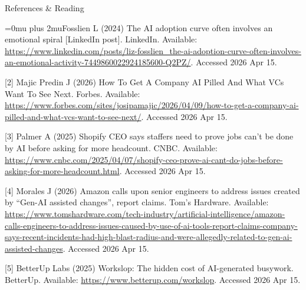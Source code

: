 \documentclass{beamer}
\begin{document}
\begin{frame}{References \& Reading}
\tiny
\raggedright
\sloppy
\Urlmuskip=0mu plus 2mu\relax
[1] Fosslien L (2024) The AI adoption curve often involves an emotional spiral [LinkedIn post]. LinkedIn. Available: \url{https://www.linkedin.com/posts/liz-fosslien_the-ai-adoption-curve-often-involves-an-emotional-activity-7449860022924185600-Q2PZ/}. Accessed 2026 Apr 15.

\vspace{0.6em}
[2] Majic Predin J (2026) How To Get A Company AI Pilled And What VCs Want To See Next. Forbes. Available: \url{https://www.forbes.com/sites/josipamajic/2026/04/09/how-to-get-a-company-ai-pilled-and-what-vcs-want-to-see-next/}. Accessed 2026 Apr 15.

\vspace{0.6em}
[3] Palmer A (2025) Shopify CEO says staffers need to prove jobs can't be done by AI before asking for more headcount. CNBC. Available: \url{https://www.cnbc.com/2025/04/07/shopify-ceo-prove-ai-cant-do-jobs-before-asking-for-more-headcount.html}. Accessed 2026 Apr 15.

\vspace{0.6em}
[4] Morales J (2026) Amazon calls upon senior engineers to address issues created by ``Gen-AI assisted changes'', report claims. Tom's Hardware. Available: \url{https://www.tomshardware.com/tech-industry/artificial-intelligence/amazon-calls-engineers-to-address-issues-caused-by-use-of-ai-tools-report-claims-company-says-recent-incidents-had-high-blast-radius-and-were-allegedly-related-to-gen-ai-assisted-changes}. Accessed 2026 Apr 15.

\vspace{0.6em}
[5] BetterUp Labs (2025) Workslop: The hidden cost of AI-generated busywork. BetterUp. Available: \url{https://www.betterup.com/workslop}. Accessed 2026 Apr 15.
\end{frame}
\end{document}
